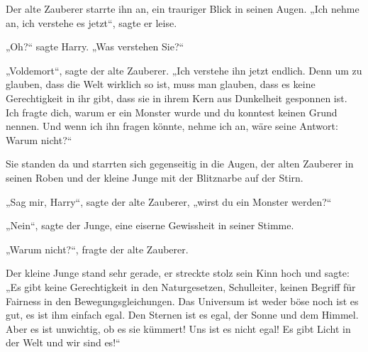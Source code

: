 Der alte Zauberer starrte ihn an, ein trauriger Blick in seinen Augen. „Ich nehme an, ich verstehe es jetzt“, sagte er leise.

„Oh?“ sagte Harry. „Was verstehen Sie?“

„Voldemort“, sagte der alte Zauberer. „Ich verstehe ihn jetzt endlich. Denn um zu glauben, dass die Welt wirklich so ist, muss man glauben, dass es keine Gerechtigkeit in ihr gibt, dass sie in ihrem Kern aus Dunkelheit gesponnen ist. Ich fragte dich, warum er ein Monster wurde und du konntest keinen Grund nennen. Und wenn ich ihn fragen könnte, nehme ich an, wäre seine Antwort: Warum nicht?“

\later

Sie standen da und starrten sich gegenseitig in die Augen, der alten Zauberer in seinen Roben und der kleine Junge mit der Blitznarbe auf der Stirn.

„Sag mir, Harry“, sagte der alte Zauberer, „wirst du ein Monster werden?“

„Nein“, sagte der Junge, eine eiserne Gewissheit in seiner Stimme.

„Warum nicht?“, fragte der alte Zauberer.

Der kleine Junge stand sehr gerade, er streckte stolz sein Kinn hoch und sagte: „Es gibt keine Gerechtigkeit in den Naturgesetzen, Schulleiter, keinen Begriff für Fairness in den Bewegungsgleichungen. Das Universum ist weder böse noch ist es gut, es ist ihm einfach egal. Den Sternen ist es egal, der Sonne und dem Himmel. Aber es ist unwichtig, ob es sie kümmert! Uns ist es nicht egal! Es gibt Licht in der Welt und wir sind es!“

